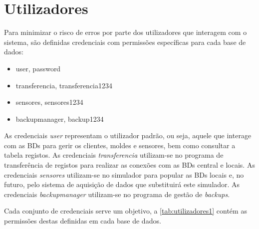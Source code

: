 \documentclass[11pt,twoside,a4paper]{report}
\begin{document}
\section{Utilizadores}
Para minimizar o risco de erros por parte dos utilizadores que interagem com o sistema, são definidas credenciais com permissões específicas para cada base de dados:
\begin{itemize}[noitemsep]
	\item user, password
	\item transferencia, transferencia1234
	\item sensores, sensores1234
	\item backupmanager, backup1234
\end{itemize}
As credenciais \textit{user} representam o utilizador padrão, ou seja, aquele que interage com as BDs para gerir os clientes, moldes e sensores, bem como consultar a tabela registos. As credenciais \textit{transferencia} utilizam-se no programa de transferência de registos para realizar as conexões com as BDs central e locais. As credenciais \textit{sensores} utilizam-se no simulador para popular as BDs locais e, no futuro, pelo sistema de aquisição de dados que substituirá este simulador. As credenciais \textit{backupmanager} utilizam-se no programa de gestão de \textit{backups}.\par 
Cada conjunto de credenciais serve um objetivo, a \autoref{tab:utilizadores1} contém as permissões destas definidas em cada base de dados.
\end{document}
